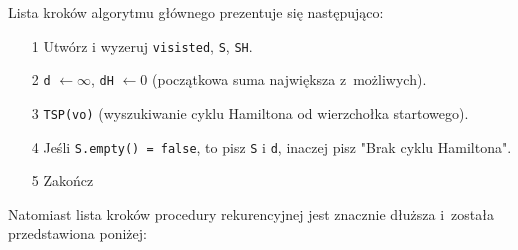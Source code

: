\documentclass[12pt,a4paper]{report}
\begin{document}
Lista kroków algorytmu głównego prezentuje się następująco:

\begin{itemize}
  \item[1] Utwórz i wyzeruj \verb+visisted+, \verb+S+, \verb+SH+.
  \item[2] \verb+d+ $\leftarrow \infty$, \verb+dH+ $\leftarrow 0$ (początkowa suma największa z~możliwych).
  \item[3] \verb+TSP(vo)+ (wyszukiwanie cyklu Hamiltona od wierzchołka startowego).
  \item[4] Jeśli \verb+S.empty() = false+, to pisz \verb+S+ i \verb+d+, inaczej pisz "Brak cyklu Hamiltona".
  \item[5] Zakończ
\end{itemize}

Natomiast lista kroków procedury rekurencyjnej jest znacznie dłuższa i~została przedstawiona poniżej:
\end{document}
